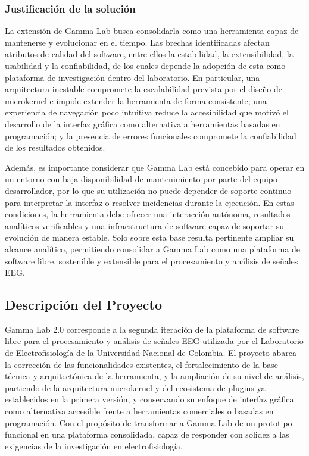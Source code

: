 \documentclass[12pt,letterpaper,oneside]{article}
\begin{document}
\subsubsection{Justificación de la solución}

La extensión de Gamma Lab busca consolidarla como una herramienta capaz de mantenerse y evolucionar en el tiempo. Las brechas identificadas afectan atributos de calidad del software, entre ellos la estabilidad, la extensibilidad, la usabilidad y la confiabilidad, de los cuales depende la adopción de esta como plataforma de investigación dentro del laboratorio. En particular, una arquitectura inestable compromete la escalabilidad prevista por el diseño de microkernel e impide extender la herramienta de forma consistente; una experiencia de navegación poco intuitiva reduce la accesibilidad que motivó el desarrollo de la interfaz gráfica como alternativa a herramientas basadas en programación; y la presencia de errores funcionales compromete la confiabilidad de los resultados obtenidos.

Además, es importante considerar que Gamma Lab está concebido para operar en un entorno con baja disponibilidad de mantenimiento por parte del equipo desarrollador, por lo que su utilización no puede depender de soporte continuo para interpretar la interfaz o resolver incidencias durante la ejecución. En estas condiciones, la herramienta debe ofrecer una interacción autónoma, resultados analíticos verificables y una infraestructura de software capaz de soportar su evolución de manera estable. Solo sobre esta base resulta pertinente ampliar su alcance analítico, permitiendo consolidar a Gamma Lab como una plataforma de software libre, sostenible y extensible para el procesamiento y análisis de señales EEG.

\subsection{Descripción del Proyecto}
Gamma Lab 2.0 corresponde a la segunda iteración de la plataforma de software libre para el procesamiento y análisis de señales EEG utilizada por el Laboratorio de Electrofisiología de la Universidad Nacional de Colombia. El proyecto abarca la corrección de las funcionalidades existentes, el fortalecimiento de la base técnica y arquitectónica de la herramienta, y la ampliación de su nivel de análisis, partiendo de la arquitectura microkernel y del ecosistema de plugins ya establecidos en la primera versión, y conservando su enfoque de interfaz gráfica como alternativa accesible frente a herramientas comerciales o basadas en programación. Con el propósito de transformar a Gamma Lab de un prototipo funcional en una plataforma consolidada, capaz de responder con solidez a las exigencias de la investigación en electrofisiología.
\end{document}
